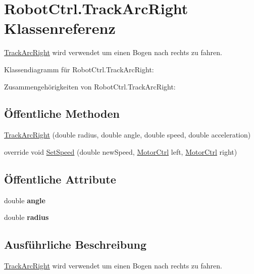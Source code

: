 \hypertarget{class_robot_ctrl_1_1_track_arc_right}{
\section{RobotCtrl.TrackArcRight Klassenreferenz}
\label{class_robot_ctrl_1_1_track_arc_right}
}


\hyperlink{class_robot_ctrl_1_1_track_arc_right}{TrackArcRight} wird verwendet um einen Bogen nach rechts zu fahren.  




Klassendiagramm für RobotCtrl.TrackArcRight:

Zusammengehörigkeiten von RobotCtrl.TrackArcRight:\subsection*{Öffentliche Methoden}
\begin{DoxyCompactItemize}
\item 
\hyperlink{class_robot_ctrl_1_1_track_arc_right_a54609ff71d77c37e9423cae42de7c347}{TrackArcRight} (double radius, double angle, double speed, double acceleration)
\item 
override void \hyperlink{class_robot_ctrl_1_1_track_arc_right_a7b2db0d3709e4919da0645a6713a87bb}{SetSpeed} (double newSpeed, \hyperlink{class_robot_ctrl_1_1_motor_ctrl}{MotorCtrl} left, \hyperlink{class_robot_ctrl_1_1_motor_ctrl}{MotorCtrl} right)
\end{DoxyCompactItemize}
\subsection*{Öffentliche Attribute}
\begin{DoxyCompactItemize}
\item 
\hypertarget{class_robot_ctrl_1_1_track_arc_right_a6e5fa9d8296e05e45d3db261997e224e}{
double {\bfseries angle}}
\label{class_robot_ctrl_1_1_track_arc_right_a6e5fa9d8296e05e45d3db261997e224e}

\item 
\hypertarget{class_robot_ctrl_1_1_track_arc_right_a499b381000fccf8f8c3af0ea1940a996}{
double {\bfseries radius}}
\label{class_robot_ctrl_1_1_track_arc_right_a499b381000fccf8f8c3af0ea1940a996}

\end{DoxyCompactItemize}


\subsection{Ausführliche Beschreibung}
\hyperlink{class_robot_ctrl_1_1_track_arc_right}{TrackArcRight} wird verwendet um einen Bogen nach rechts zu fahren. 

